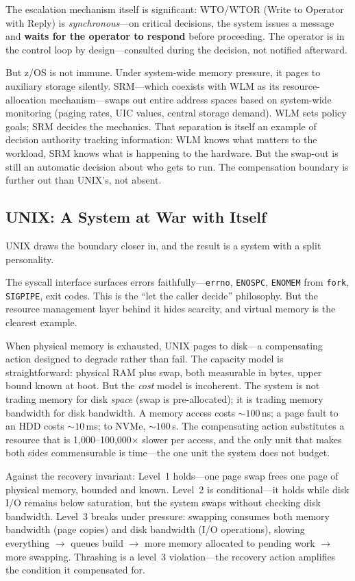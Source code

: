 \documentclass[11pt]{article}
\begin{document}
The escalation mechanism itself is significant: WTO/WTOR (Write to Operator with
Reply) is \emph{synchronous}---on critical decisions, the system issues a
message and \textbf{waits for the operator to respond} before proceeding. The
operator is in the control loop by design---consulted during the decision, not
notified afterward.

But z/OS is not immune. Under system-wide memory pressure, it pages to auxiliary
storage silently. SRM---which coexists with WLM as its resource-allocation
mechanism---swaps out entire address spaces based on system-wide monitoring
(paging rates, UIC values, central storage demand). WLM sets policy goals; SRM
decides the mechanics. That separation is itself an example of decision authority
tracking information: WLM knows what matters to the workload, SRM knows what is
happening to the hardware. But the swap-out is still an automatic decision about
who gets to run. The compensation boundary is further out than UNIX's, not
absent.

\subsection{UNIX: A System at War with Itself}

UNIX draws the boundary closer in, and the result is a system with a split
personality.

The syscall interface surfaces errors faithfully---\texttt{errno},
\texttt{ENOSPC}, \texttt{ENOMEM} from \texttt{fork}, \texttt{SIGPIPE}, exit
codes. This is the ``let the caller decide'' philosophy. But the resource
management layer behind it hides scarcity, and virtual memory is the clearest
example.

When physical memory is exhausted, UNIX pages to disk---a compensating action
designed to degrade rather than fail. The capacity model is straightforward:
physical RAM plus swap, both measurable in bytes, upper bound known at boot. But
the \emph{cost} model is incoherent. The system is not trading memory for disk
\emph{space} (swap is pre-allocated); it is trading memory bandwidth for disk
bandwidth. A memory access costs ${\sim}100$\,ns; a page fault to an HDD costs
${\sim}10$\,ms; to NVMe, ${\sim}100$\,\textmu s. The compensating action
substitutes a resource that is 1,000--100,000$\times$ slower per access, and the
only unit that makes both sides commensurable is time---the one unit the system
does not budget.

Against the recovery invariant: Level~1 holds---one page swap frees one page of
physical memory, bounded and known. Level~2 is conditional---it holds while disk
I/O remains below saturation, but the system swaps without checking disk
bandwidth. Level~3 breaks under pressure: swapping consumes both memory bandwidth
(page copies) and disk bandwidth (I/O operations), slowing everything $\to$
queues build $\to$ more memory allocated to pending work $\to$ more swapping.
Thrashing is a level~3 violation---the recovery action amplifies the condition it
compensated for.
\end{document}
